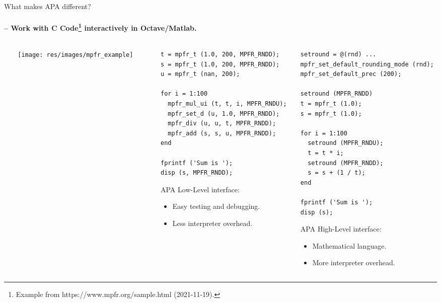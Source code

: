 \begin{frame}[fragile]{What makes APA different?}
\framesubtitle{-- Work with C Code\footnote{Example
from https://www.mpfr.org/sample.html (2021-11-19).}
interactively in Octave/Matlab.}

\begin{columns}
\begin{column}[T]{0.01\textwidth}
\end{column}
\begin{column}[T]{0.3\textwidth}
\texttt{[image: res/images/mpfr\_example]}
\end{column}
\begin{column}[T]{0.01\textwidth}
\end{column}
\begin{column}[T]{0.38\textwidth}
\begin{lstlisting}[basicstyle=\tiny,
  columns=fullflexible,
  upquote=true,]
t = mpfr_t (1.0, 200, MPFR_RNDD);
s = mpfr_t (1.0, 200, MPFR_RNDD);
u = mpfr_t (nan, 200);

for i = 1:100
  mpfr_mul_ui (t, t, i, MPFR_RNDU);
  mpfr_set_d (u, 1.0, MPFR_RNDD);
  mpfr_div (u, u, t, MPFR_RNDD);
  mpfr_add (s, s, u, MPFR_RNDD);
end

fprintf ('Sum is ');
disp (s, MPFR_RNDD);
\end{lstlisting}

\bigskip

APA {\color{blue}Low-Level} interface:
\begin{itemize}
\item
Easy testing and debugging.

\item
Less interpreter overhead.
\end{itemize}

\end{column}
\begin{column}[T]{0.4\textwidth}

\vspace*{-1cm}
\begin{lstlisting}[basicstyle=\tiny,
  columns=fullflexible,
  upquote=true,]
setround = @(rnd) ...
mpfr_set_default_rounding_mode (rnd);
mpfr_set_default_prec (200);

setround (MPFR_RNDD)
t = mpfr_t (1.0);
s = mpfr_t (1.0);

for i = 1:100
  setround (MPFR_RNDU);
  t = t * i;
  setround (MPFR_RNDD);
  s = s + (1 / t);
end

fprintf ('Sum is ');
disp (s);
\end{lstlisting}

\bigskip

APA {\color{blue}High-Level} interface:
\begin{itemize}
\item
Mathematical language.

\item
More interpreter overhead.
\end{itemize}

\end{column}
\end{columns}

\end{frame}


